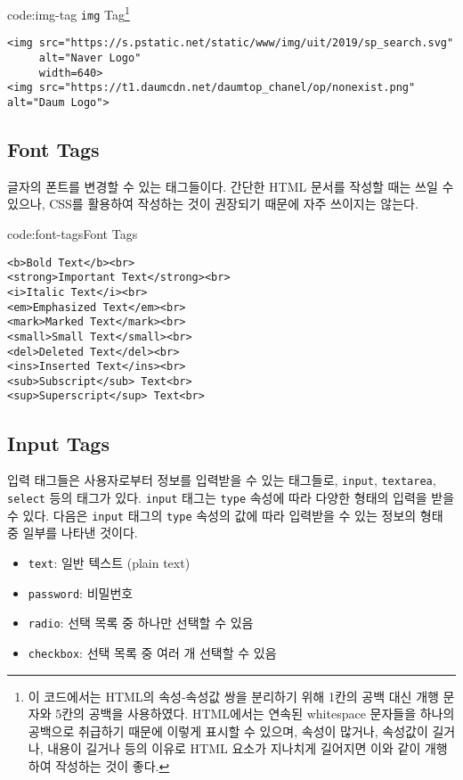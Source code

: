 \begin{codeenv}{code:img-tag}
    {\texttt{img} Tag\footnote{이 코드에서는 HTML의 속성-속성값 쌍을 분리하기 위해 1칸의 공백 대신 개행 문자와 5칸의 공백을 사용하였다. HTML에서는 연속된 whitespace 문자들을 하나의 공백으로 취급하기 때문에 이렇게 표시할 수 있으며, 속성이 많거나, 속성값이 길거나, 내용이 길거나 등의 이유로 HTML 요소가 지나치게 길어지면 이와 같이 개행하여 작성하는 것이 좋다.}}
    \begin{verbatim}
<img src="https://s.pstatic.net/static/www/img/uit/2019/sp_search.svg"
     alt="Naver Logo"
     width=640>
<img src="https://t1.daumcdn.net/daumtop_chanel/op/nonexist.png" alt="Daum Logo">
\end{verbatim}
\end{codeenv}

\subsection*{Font Tags}
글자의 폰트를 변경할 수 있는 태그들이다. 간단한 HTML 문서를 작성할 때는 쓰일 수 있으나, CSS를 활용하여 작성하는 것이 권장되기 때문에 자주 쓰이지는 않는다. 

\begin{codeenv}{code:font-tags}{Font Tags}\begin{verbatim}
<b>Bold Text</b><br>
<strong>Important Text</strong><br>
<i>Italic Text</i><br>
<em>Emphasized Text</em><br>
<mark>Marked Text</mark><br>
<small>Small Text</small><br>
<del>Deleted Text</del><br>
<ins>Inserted Text</ins><br>
<sub>Subscript</sub> Text<br>
<sup>Superscript</sup> Text<br>
\end{verbatim}
\end{codeenv}

\subsection*{Input Tags}
입력 태그들은 사용자로부터 정보를 입력받을 수 있는 태그들로, \texttt{input}, \texttt{textarea}, \texttt{select} 등의 태그가 있다. \texttt{input} 태그는 \texttt{type} 속성에 따라 다양한 형태의 입력을 받을 수 있다. 다음은 \texttt{input} 태그의 \texttt{type} 속성의 값에 따라 입력받을 수 있는 정보의 형태 중 일부를 나타낸 것이다.

\begin{itemize}
    \item \texttt{text}: 일반 텍스트 (plain text)
    \item \texttt{password}: 비밀번호
    \item \texttt{radio}: 선택 목록 중 하나만 선택할 수 있음
    \item \texttt{checkbox}: 선택 목록 중 여러 개 선택할 수 있음
\end{itemize}

